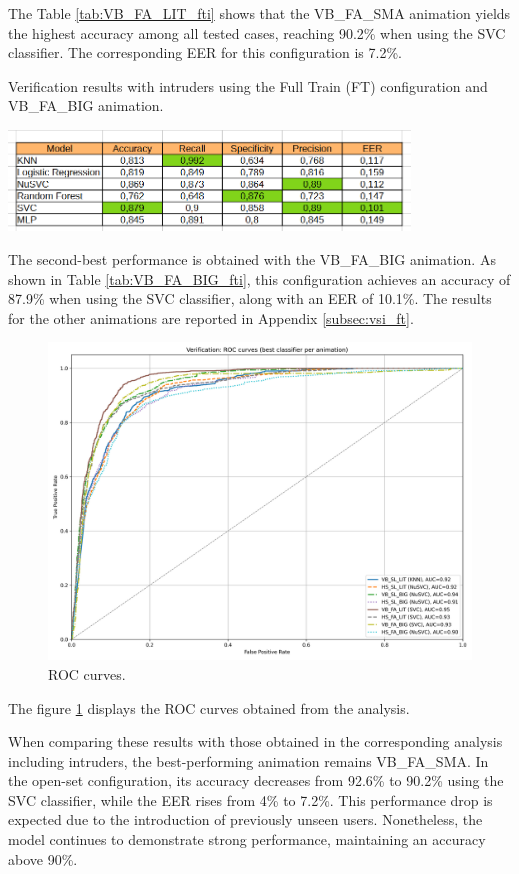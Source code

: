 \documentclass[12pt]{report}
\begin{document}
The Table \ref{tab:VB_FA_LIT_fti} shows that the VB\_FA\_SMA animation yields the highest accuracy among all tested cases, reaching 90.2\% when using the SVC classifier. 
The corresponding EER for this configuration is 7.2\%.

\begin{table}[ht]
    \centering
    \caption{Verification results with intruders using the Full Train (FT) configuration and VB\_FA\_BIG animation.}
    \includegraphics[width=0.8\textwidth]{Images/Results/Verification_single_intruders/ft/VB_FA_BIG.png}
    \label{tab:VB_FA_BIG_fti}
\end{table}

The second-best performance is obtained with the VB\_FA\_BIG animation. 
As shown in Table \ref{tab:VB_FA_BIG_fti}, this configuration achieves an accuracy of 87.9\% when using the SVC classifier, along with an EER of 10.1\%. 
The results for the other animations are reported in Appendix \ref{subsec:vsi_ft}.


\begin{figure}[ht]
    \centering
    \includegraphics[width = 0.6
    \textwidth]{Images/Results/Verification_single_intruders/ft/best_animation_roc_curves_ft.png}
    \caption{ROC curves.}
    \label{fig:roc_fti}
\end{figure}

The figure \ref{fig:roc_fti} displays the ROC curves obtained from the analysis.

When comparing these results with those obtained in the corresponding analysis including intruders, the best-performing animation remains VB\_FA\_SMA. 
In the open-set configuration, its accuracy decreases from 92.6\% to 90.2\% using the SVC classifier, while the EER rises from 4\% to 7.2\%. 
This performance drop is expected due to the introduction of previously unseen users. 
Nonetheless, the model continues to demonstrate strong performance, maintaining an accuracy above 90\%.
\end{document}
